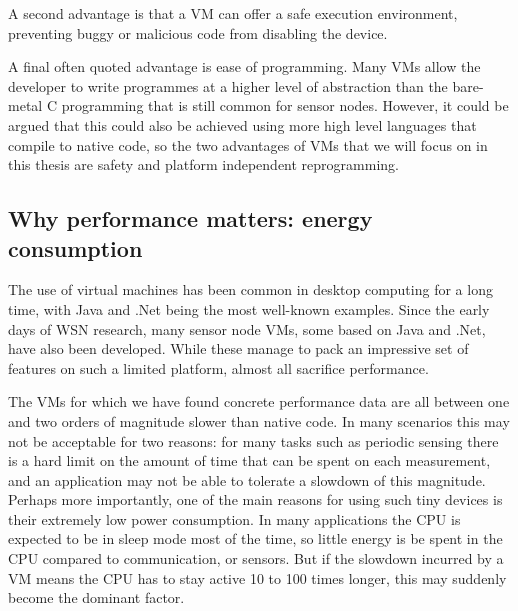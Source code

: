 A second advantage is that a VM can offer a safe execution environment, preventing buggy or malicious code from disabling the device.

A final often quoted advantage is ease of programming. Many VMs allow the developer to write programmes at a higher level of abstraction than the bare-metal C programming that is still common for sensor nodes. However, it could be argued that this could also be achieved using more high level languages that compile to native code, so the two advantages of VMs that we will focus on in this thesis are safety and platform independent reprogramming.

\subsection{Why performance matters: energy consumption}
The use of virtual machines has been common in desktop computing for a long time, with Java and .Net being the most well-known examples. Since the early days of WSN research, many sensor node VMs, some based on Java and .Net, have also been developed. While these manage to pack an impressive set of features on such a limited platform, almost all sacrifice performance.

The VMs for which we have found concrete performance data are all between one and two orders of magnitude slower than native code. In many scenarios this may not be acceptable for two reasons: for many tasks such as periodic sensing there is a hard limit on the amount of time that can be spent on each measurement, and an application may not be able to tolerate a slowdown of this magnitude. Perhaps more importantly, one of the main reasons for using such tiny devices is their extremely low power consumption. In many applications the CPU is expected to be in sleep mode most of the time, so little energy is be spent in the CPU compared to communication, or sensors. But if the slowdown incurred by a VM means the CPU has to stay active 10 to 100 times longer, this may suddenly become the dominant factor.

